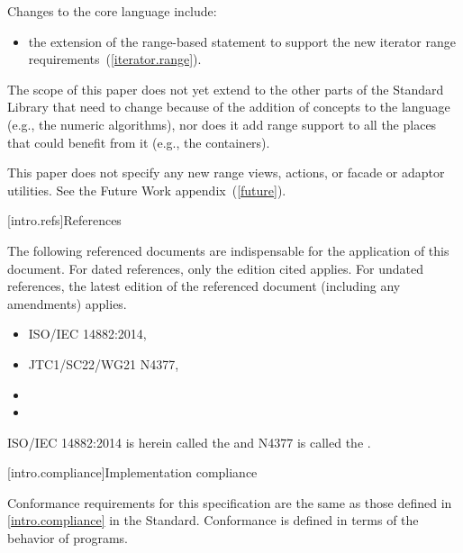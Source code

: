 \pnum
Changes to the core language include:

\begin{itemize}
\item the extension of the range-based  statement to support
the new iterator range requirements~(\ref{iterator.range}).
\end{itemize}


\pnum
The scope of this paper does not yet extend to the other parts of the Standard Library
that need to change because of the addition of concepts to the language (e.g., the numeric
algorithms), nor does it add range support to all the places that could benefit from it (e.g.,
the containers).

\pnum
This paper does not specify any new range views, actions, or facade or adaptor
utilities. See the Future Work appendix~(\ref{future}).

[intro.refs]{References}

\pnum
The following referenced documents are indispensable for the
application of this document. For dated references, only the
edition cited applies. For undated references, the latest edition
of the referenced document (including any amendments) applies.

\begin{itemize}
\item ISO/IEC 14882:2014, 
\item JTC1/SC22/WG21 N4377, 
\item {}
\item {}
\end{itemize}

ISO/IEC 14882:2014 is herein called the  and N4377 is called the .

[intro.compliance]{Implementation compliance}

\pnum
Conformance requirements for this specification are the same as those
defined in \ref{intro.compliance} in the \Cpp Standard.
\enternote
Conformance is defined in terms of the behavior of programs.
\exitnote

